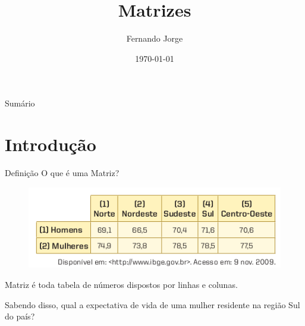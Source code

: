 \documentclass[aspectratio=169,xcolor=dvipsnames]{beamer}
\title[short title]{Matrizes} %
\author[Fernando-Jorge] {Fernando Jorge}
\institute[NTU] %
{
  Escola Estadual Professor Lima Castro
}
\date{\today} %
\begin{document}
\begin{frame}
    \titlepage
\end{frame}

\begin{frame}{Sumário}
    \tableofcontents
\end{frame}

\section{Introdução}

\begin{frame}{Definição}
  O que é uma Matriz?
  \begin{figure}[htb!]
    \centering
    \includegraphics[width=.6\linewidth]{images/quadro.png}
  \end{figure}
  Matriz é toda tabela de números dispostos por linhas e colunas.

  Sabendo disso, qual a expectativa de vida de uma mulher residente na região Sul do país?
\end{frame}

\end{document}
